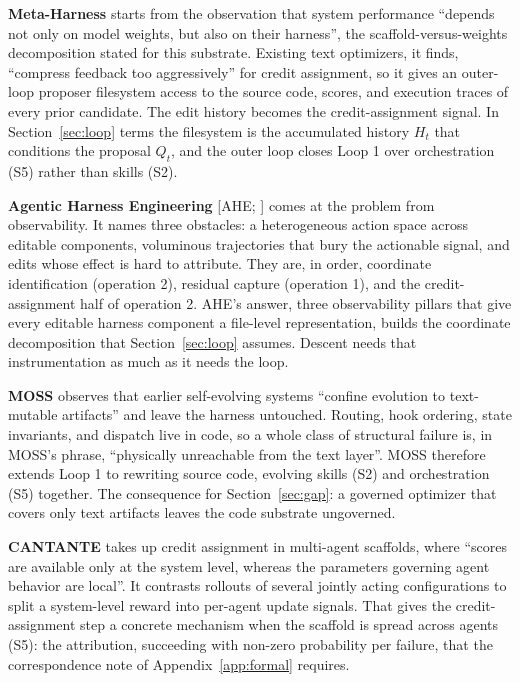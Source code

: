 \documentclass[
  11pt,
]{article}
\begin{document}
\textbf{Meta-Harness} \cite{lee2026metaharness} starts from the observation that system performance ``depends not only on model weights, but also on their harness'', the scaffold-versus-weights decomposition stated for this substrate. Existing text optimizers, it finds, ``compress feedback too aggressively'' for credit assignment, so it gives an outer-loop proposer filesystem access to the source code, scores, and execution traces of every prior candidate. The edit history becomes the credit-assignment signal. In Section~\ref{sec:loop} terms the filesystem is the accumulated history \(H_t\) that conditions the proposal \(Q_t\), and the outer loop closes Loop 1 over orchestration (S5) rather than skills (S2).

\textbf{Agentic Harness Engineering} {[}AHE; \cite{lin2026ahe}{]} comes at the problem from observability. It names three obstacles: a heterogeneous action space across editable components, voluminous trajectories that bury the actionable signal, and edits whose effect is hard to attribute. They are, in order, coordinate identification (operation 2), residual capture (operation 1), and the credit-assignment half of operation 2. AHE's answer, three observability pillars that give every editable harness component a file-level representation, builds the coordinate decomposition that Section~\ref{sec:loop} assumes. Descent needs that instrumentation as much as it needs the loop.

\textbf{MOSS} \cite{cai2026moss} observes that earlier self-evolving systems ``confine evolution to text-mutable artifacts'' and leave the harness untouched. Routing, hook ordering, state invariants, and dispatch live in code, so a whole class of structural failure is, in MOSS's phrase, ``physically unreachable from the text layer''. MOSS therefore extends Loop 1 to rewriting source code, evolving skills (S2) and orchestration (S5) together. The consequence for Section~\ref{sec:gap}: a governed optimizer that covers only text artifacts leaves the code substrate ungoverned.

\textbf{CANTANTE} \cite{zehle2026cantante} takes up credit assignment in multi-agent scaffolds, where ``scores are available only at the system level, whereas the parameters governing agent behavior are local''. It contrasts rollouts of several jointly acting configurations to split a system-level reward into per-agent update signals. That gives the credit-assignment step a concrete mechanism when the scaffold is spread across agents (S5): the attribution, succeeding with non-zero probability per failure, that the correspondence note of Appendix~\ref{app:formal} requires.
\end{document}
